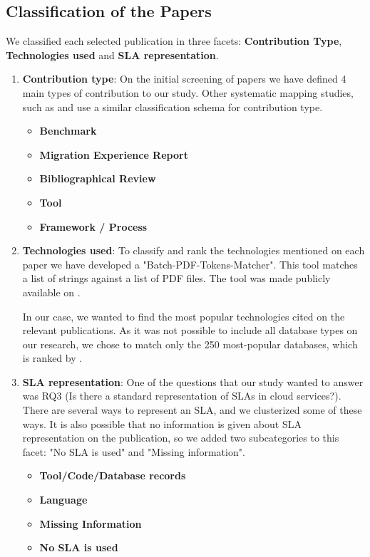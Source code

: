 \documentclass{article}
\begin{document}
\subsection{Classification of the Papers}

We classified each selected publication in three facets: \textbf{Contribution Type}, \textbf{Technologies used} and \textbf{SLA representation}. 


\begin{enumerate}
    \item \textbf{Contribution type}: On the initial screening of papers we have defined 4 main types of contribution to our study. Other systematic mapping studies, such as \cite{6405289} and \cite{Ameller201542} use a similar classification schema for contribution type.
    \begin{itemize}
      \item \textbf{Benchmark}
      \item \textbf{Migration Experience Report}
      \item \textbf{Bibliographical Review}
      \item \textbf{Tool}
      \item \textbf{Framework / Process}
    \end{itemize}
    \item \textbf{Technologies used}: To classify and rank the technologies mentioned on each paper we have developed a "Batch-PDF-Tokens-Matcher". This tool matches a list of strings against a list of PDF files. The tool was made publicly available on \cite{pythonBatchPDFTokenMatcher}.

    In our case, we wanted to find the most popular technologies cited on the relevant publications. As it was not possible to include all database types on our research, we chose to match only the 250 most-popular databases, which is ranked by \cite{dbranking}.

    \item \textbf{SLA representation}: One of the questions that our study wanted to answer was RQ3 (Is there a standard representation of SLAs in cloud services?). There are several ways to represent an SLA, and we clusterized some of these ways. It is also possible that no information is given about SLA representation on the publication, so we added two subcategories to this facet: "No SLA is used" and "Missing information".  
    \begin{itemize}
      \item \textbf{Tool/Code/Database records}
      \item \textbf{Language}
      \item \textbf{Missing Information}
      \item \textbf{No SLA is used}
    \end{itemize}  
\end{enumerate}
\end{document}
